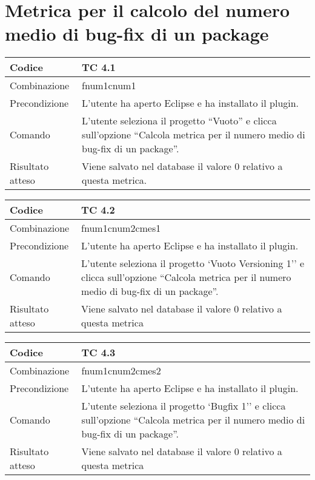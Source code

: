 \clearpage

\section{Metrica per il calcolo del numero medio di bug-fix di un package}

\begin{table}[ht]
\begin{tabular}{|p{3cm}|p{9cm}|}
\hline
\cellcolor{lightgray}Codice				& TC 4.1								\\
\hline
\cellcolor{lightgray}Combinazione		& fnum1cnum1									\\
\hline
\cellcolor{lightgray}Precondizione		& L'utente ha aperto Eclipse e ha installato il plugin.		\\
\hline
\cellcolor{lightgray}Comando			& L'utente seleziona il progetto ``Vuoto''  e clicca sull'opzione ``Calcola metrica per il numero medio di bug-fix di un package''.	\\
\hline
\cellcolor{lightgray}Risultato atteso	& Viene salvato nel database il valore 0 relativo a questa metrica.\\
\hline
\end{tabular}
\end{table}

\begin{table}[ht]
\begin{tabular}{|p{3cm}|p{9cm}|}
\hline
\cellcolor{lightgray}Codice				& TC 4.2								\\
\hline
\cellcolor{lightgray}Combinazione		& fnum1cnum2cmes1 									\\
\hline
\cellcolor{lightgray}Precondizione		& L'utente ha aperto Eclipse e ha installato il plugin.				\\
\hline
\cellcolor{lightgray}Comando			& L'utente seleziona il progetto `Vuoto Versioning 1''  e clicca sull'opzione ``Calcola metrica per il numero medio di bug-fix di un package''.	\\
\hline
\cellcolor{lightgray}Risultato atteso	& Viene salvato nel database il valore 0 relativo a questa metrica	\\
\hline
\end{tabular}
\end{table}

\begin{table}[ht]
\begin{tabular}{|p{3cm}|p{9cm}|}
\hline
\cellcolor{lightgray}Codice				& TC 4.3								\\
\hline
\cellcolor{lightgray}Combinazione		& fnum1cnum2cmes2									\\
\hline
\cellcolor{lightgray}Precondizione		& L'utente ha aperto Eclipse e ha installato il plugin.					\\
\hline
\cellcolor{lightgray}Comando			& L'utente seleziona il progetto `Bugfix 1''  e clicca sull'opzione ``Calcola metrica per il numero medio di bug-fix di un package''.	\\
\hline
\cellcolor{lightgray}Risultato atteso	& Viene salvato nel database il valore 0 relativo a questa metrica	\\
\hline
\end{tabular}
\end{table}

